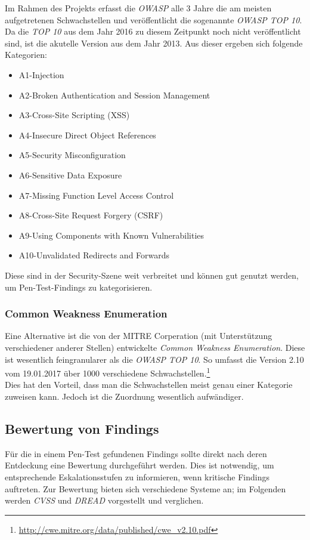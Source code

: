 		Im Rahmen des Projekts erfasst die \textit{OWASP} alle 3 Jahre die am meisten aufgetretenen Schwachstellen und veröffentlicht die sogenannte \textit{OWASP TOP 10}. Da die \textit{TOP 10} aus dem Jahr 2016 zu diesem Zeitpunkt noch nicht veröffentlicht sind, ist die akutelle Version aus dem Jahr 2013. Aus dieser ergeben sich folgende Kategorien\cite{OWASPTOP10}:
		\begin{itemize}
			\item A1-Injection
			\item A2-Broken Authentication and Session Management
			\item A3-Cross-Site Scripting (XSS)
			\item A4-Insecure Direct Object References
			\item A5-Security Misconfiguration
			\item A6-Sensitive Data Exposure
			\item A7-Missing Function Level Access Control
			\item A8-Cross-Site Request Forgery (CSRF)
			\item A9-Using Components with Known Vulnerabilities 
			\item A10-Unvalidated Redirects and Forwards
		\end{itemize}
		
		Diese sind in der Security-Szene weit verbreitet und können gut genutzt werden, um Pen-Test-Findings zu kategorisieren.
		
		\subsubsection{Common Weakness Enumeration}
		Eine Alternative ist die von der MITRE Corperation (mit Unterstützung verschiedener anderer Stellen) entwickelte \textit{Common Weakness Enumeration}. Diese ist wesentlich feingranularer als die \textit{OWASP TOP 10}. So umfasst die Version 2.10 vom 19.01.2017 über 1000 verschiedene Schwachstellen.\footnote{\url{http://cwe.mitre.org/data/published/cwe_v2.10.pdf}}\cite{MITRECWE}\\
		
		Dies hat den Vorteil, dass man die Schwachstellen meist genau einer Kategorie zuweisen kann. Jedoch ist die Zuordnung wesentlich aufwändiger.
			
	\subsection{Bewertung von Findings}
	Für die in einem Pen-Test gefundenen Findings sollte direkt nach deren Entdeckung eine Bewertung durchgeführt werden. Dies ist notwendig, um entsprechende Eskalationsstufen zu informieren, wenn kritische Findings auftreten. Zur Bewertung bieten sich verschiedene Systeme an; im Folgenden werden \textit{CVSS} und \textit{DREAD} vorgestellt und verglichen.
	
